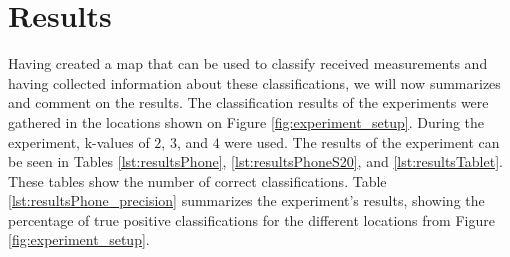 \section{Results}\label{sec:experiment_results}
Having created a map that can be used to classify received measurements and having collected information about these classifications, we will now summarizes and comment on the results. 
The classification results of the experiments were gathered in the locations shown on Figure \ref{fig:experiment_setup}. During the experiment, k-values of $2$, $3$, and $4$ were used.  
The results of the experiment can be seen in Tables \ref{lst:resultsPhone}, \ref{lst:resultsPhoneS20}, and \ref{lst:resultsTablet}.
These tables show the number of correct classifications. 
Table \ref{lst:resultsPhone_precision} summarizes the experiment's results, showing the percentage of true positive classifications for the different locations from Figure \ref{fig:experiment_setup}.

\begin{table}[H]
    \caption{Evaluation results from Samsung Galaxy A53 showing the number of correct classifications out of a possible ten for each k-value}
    \label{lst:resultsPhone}
\end{table}

